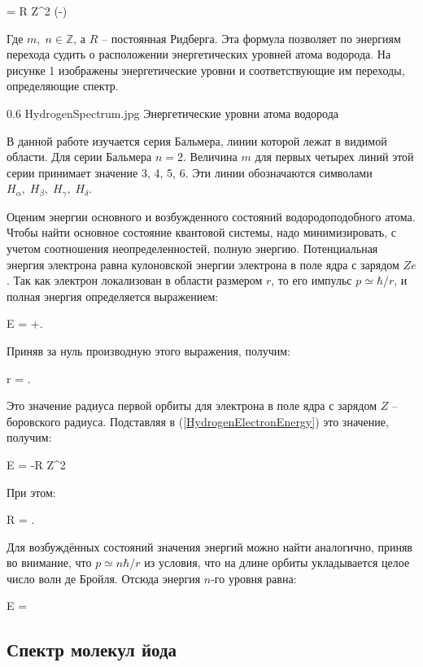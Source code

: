 {
     = R Z^2 (-)
}

Где $ m, \;n \in \mathbb{Z} $, а $ R $ -- постоянная Ридберга.
Эта формула позволяет по энергиям перехода судить о расположении энергетических уровней атома водорода. На рисунке 1
изображены энергетические уровни и соответствующие им переходы, определяющие спектр.

\pic
{0.6\linewidth}
{HydrogenSpectrum.jpg}
{Энергетические уровни атома водорода}

В данной работе изучается серия Бальмера, линии которой лежат в видимой области. Для серии Бальмера $ n = 2 $.
Величина $ m $ для первых четырех линий этой серии принимает значение 3, 4, 5, 6. Эти линии обозначаются символами
$ H_\alpha, \;H_\beta, \;H_\gamma, \;H_\delta $.

Оценим энергии основного и возбужденного состояний водородоподобного атома. Чтобы найти основное состояние квантовой
системы, надо минимизировать, с учетом соотношения неопределенностей, полную энергию. Потенциальная энергия электрона
равна кулоновской энергии электрона в поле ядра с зарядом $ Z e $. Так как электрон локализован в области размером
$ r $, то его импульс $ p \simeq \hbar / r $, и полная энергия определяется выражением:


{
    E = +.
}

Приняв за нуль производную этого выражения, получим:

{
    r = .
}

Это значение радиуса первой орбиты для электрона в поле ядра с зарядом $ Z $ -- боровского радиуса.
Подставляя в (\ref{HydrogenElectronEnergy}) это значение, получим:

{
    E = -R Z^2
}

При этом:

{
    R = .
}

Для возбуждённых состояний значения энергий можно найти аналогично, приняв во внимание, что $ p \simeq n \hbar / r $
из условия, что на длине орбиты укладывается целое число волн де Бройля. Отсюда энергия $ n $-го уровня равна:

{
    E = 
}

\subsection{Спектр молекул йода}

